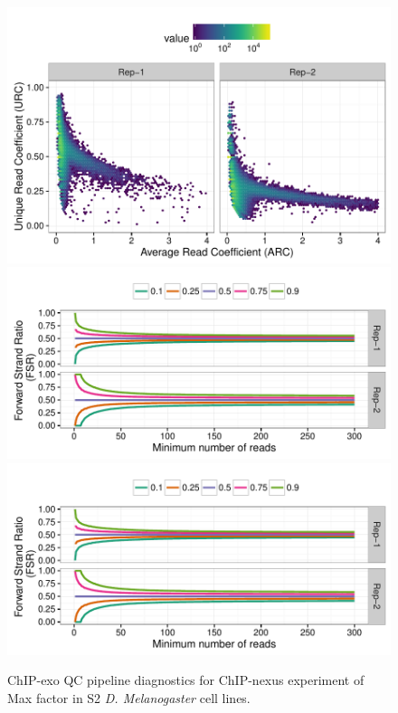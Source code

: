 \documentclass{article}
\begin{document}
\begin{figure}[H]
  \centering
  \includegraphics[width = .65\textwidth,page =
1]{figures/supplement/QC/ChIPnexus_S2_max_enrichment.pdf}\\
\includegraphics[width = .65\textwidth,page =
1]{figures/supplement/QC/ChIPnexus_S2_max_strand_imbalance.pdf}
\includegraphics[width = .65\textwidth,page =
3]{figures/supplement/QC/ChIPnexus_S2_max_strand_imbalance.pdf}
\caption{ChIP-exo QC pipeline diagnostics for ChIP-nexus experiment of
  Max factor in S2 \emph{D. Melanogaster} cell lines.}
  \label{sfig:qc9}
\end{figure}
\end{document}

